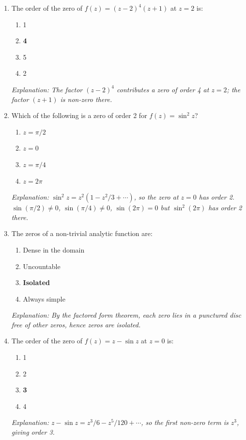 \documentclass[12pt,a4paper]{article}
\begin{document}
\begin{enumerate}[label=\textbf{MCQ\arabic*.}]

\item The order of the zero of $f(z) = (z-2)^4(z+1)$ at $z=2$ is:
\begin{enumerate}[label=(\alph*)]
  \item 1
  \item \textbf{4}
  \item 5
  \item 2
\end{enumerate}
\textit{Explanation: The factor $(z-2)^4$ contributes a zero of order 4 at $z=2$;
the factor $(z+1)$ is non-zero there.}

\item Which of the following is a zero of order 2 for $f(z)=\sin^2 z$?
\begin{enumerate}[label=(\alph*)]
  \item $z=\pi/2$
  \item \textbf{$z=0$}
  \item $z=\pi/4$
  \item $z=2\pi$
\end{enumerate}
\textit{Explanation: $\sin^2 z = z^2(1-z^2/3+\cdots)$, so the zero at $z=0$ has order 2.
$\sin(\pi/2)\neq 0$, $\sin(\pi/4)\neq 0$, $\sin(2\pi)=0$ but $\sin^2(2\pi)$ has order 2 there.}

\item The zeros of a non-trivial analytic function are:
\begin{enumerate}[label=(\alph*)]
  \item Dense in the domain
  \item Uncountable
  \item \textbf{Isolated}
  \item Always simple
\end{enumerate}
\textit{Explanation: By the factored form theorem, each zero lies in a punctured disc free
of other zeros, hence zeros are isolated.}

\item The order of the zero of $f(z)=z-\sin z$ at $z=0$ is:
\begin{enumerate}[label=(\alph*)]
  \item 1
  \item 2
  \item \textbf{3}
  \item 4
\end{enumerate}
\textit{Explanation: $z-\sin z = z^3/6 - z^5/120 + \cdots$, so the first non-zero term is $z^3$,
giving order 3.}


\end{enumerate}
\end{document}
